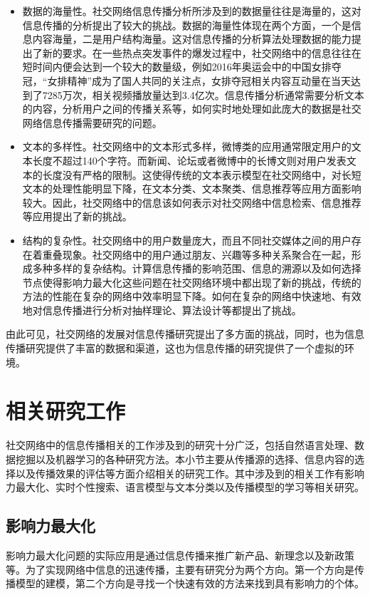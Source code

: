 \begin{itemize}
	\item 数据的海量性。社交网络信息传播分析所涉及到的数据量往往是海量的，这对信息传播的分析提出了较大的挑战。数据的海量性体现在两个方面，一个是信息内容海量，二是用户结构海量。这对信息传播的分析算法处理数据的能力提出了新的要求。在一些热点突发事件的爆发过程中，社交网络中的信息往往在短时间内便会达到一个较大的数量级，例如2016年奥运会中的中国女排夺冠，“女排精神”成为了国人共同的关注点，女排夺冠相关内容互动量在当天达到了7285万次，相关视频播放量达到3.4亿次。信息传播分析通常需要分析文本的内容，分析用户之间的传播关系等，如何实时地处理如此庞大的数据是社交网络信息传播需要研究的问题。
	\item 文本的多样性。社交网络中的文本形式多样，微博类的应用通常限定用户的文本长度不超过140个字符。而新闻、论坛或者微博中的长博文则对用户发表文本的长度没有严格的限制。这使得传统的文本表示模型在社交网络中，对长短文本的处理性能明显下降，在文本分类、文本聚类、信息推荐等应用方面影响较大。因此，社交网络中的信息该如何表示对社交网络中信息检索、信息推荐等应用提出了新的挑战。
	\item 结构的复杂性。社交网络中的用户数量庞大，而且不同社交媒体之间的用户存在着重叠现象。社交网络中的用户通过朋友、兴趣等多种关系聚合在一起，形成多种多样的复杂结构。计算信息传播的影响范围、信息的溯源以及如何选择节点使得影响力最大化这些问题在社交网络环境中都出现了新的挑战，传统的方法的性能在复杂的网络中效率明显下降。如何在复杂的网络中快速地、有效地对信息传播进行分析对抽样理论、算法设计等都提出了挑战。
\end{itemize}

由此可见，社交网络的发展对信息传播研究提出了多方面的挑战，同时，也为信息传播研究提供了丰富的数据和渠道，这也为信息传播的研究提供了一个虚拟的环境。

\section{相关研究工作}
\label{sec1:relatedWorks}
社交网络中的信息传播相关的工作涉及到的研究十分广泛，包括自然语言处理、数据挖掘以及机器学习的各种研究方法。本小节主要从传播源的选择、信息内容的选择以及传播效果的评估等方面介绍相关的研究工作。其中涉及到的相关工作有影响力最大化、实时个性搜索、语言模型与文本分类以及传播模型的学习等相关研究。
\subsection{影响力最大化}
\label{subsec1:influenceMax}
影响力最大化问题的实际应用是通过信息传播来推广新产品、新理念以及新政策等。为了实现网络中信息的迅速传播，主要有研究分为两个方向。第一个方向是传播模型的建模，第二个方向是寻找一个快速有效的方法来找到具有影响力的个体。

